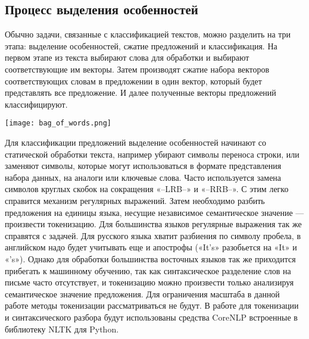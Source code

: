 \subsection{Процесс выделения особенностей}\label{subsec:domain:domain_feature_extraction}
Обычно задачи, связанные с классификацией текстов, можно разделить на три этапа: выделение особенностей, сжатие предложений и классификация. На первом этапе из текста выбирают слова для обработки и выбирают соответствующие им векторы. Затем производят сжатие набора векторов соответствующих словам в предложении в один вектор, который будет представлять все предложение. И далее полученные векторы предложений классифицируют\cite{Goodfellow-et-al-2016}.

\begin{center}
  \texttt{[image: bag\_of\_words.png]}
  \label{fig:domain:bag_of_words}
\end{center}

Для классификации предложений выделение особенностей начинают со статической обработки текста, например убирают символы переноса строки, или заменяют символы, которые могут использоваться в формате представления набора данных, на аналоги или ключевые слова. Часто используется замена символов круглых скобок на сокращения «--LRB--» и «--RRB--». С этим легко справится механизм регулярных выражений. Затем необходимо разбить предложения на единицы языка, несущие независимое семантическое значение --- произвести токенизацию. Для большинства языков регулярные выражения так же справятся с задачей. Для русского языка хватит разбиения по символу пробела, в английском надо будет учитывать еще и апострофы («It's» разобьется на «It» и «'s»). Однако для обработки большинства восточных языков так же приходится прибегать к машинному обучению, так как синтаксическое разделение слов на письме часто отсутствует, и токенизацию можно произвести только анализируя семантическое значение предложения. Для ограничения масштаба в данной работе методы токенизации рассматриваться не будут\cite{Goodfellow-et-al-2016}.
В работе для токенизации и синтаксического разбора будут использованы средства CoreNLP встроенные в библиотеку NLTK для Python.

